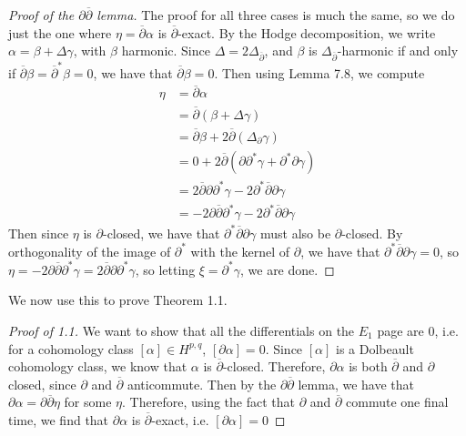 \documentclass[psamsfonts, 12pt]{amsart}
\theoremstyle{definition}
\theoremstyle{remark}
\newcommand{\dbar}{\overline{\partial}}
\begin{document}
%
\begin{proof}[Proof of the $\partial\dbar$ lemma]
The proof for all three cases is much the same, so we do just the one where
$\eta = \dbar\alpha$ is $\dbar$-exact. By the Hodge decomposition, we write
$\alpha = \beta + \Delta\gamma$, with $\beta$ harmonic. Since
$\Delta = 2\Delta_{\dbar}$, and $\beta$ is $\Delta_{\dbar}$-harmonic if and only
if $\dbar\beta = \dbar^*\beta = 0$, we have that $\dbar\beta = 0$. Then
using Lemma 7.8, we compute
\begin{align*}
\eta &= \dbar\alpha \\
&= \dbar(\beta + \Delta\gamma) \\
&= \dbar\beta + 2\dbar(\Delta_\partial\gamma) \\
&= 0 + 2\dbar(\partial\partial^*\gamma + \partial^*\partial\gamma) \\
&= 2\dbar\partial\partial^*\gamma - 2\partial^*\dbar\partial\gamma \\
&= -2\partial\dbar\partial^*\gamma - 2\partial^*\dbar\partial\gamma
\end{align*}
Then since $\eta$ is $\partial$-closed, we have that $\partial^*\dbar\partial\gamma$
must also be $\partial$-closed. By orthogonality of the image of $\partial^*$ with
the kernel of $\partial$, we have that $\partial^*\dbar\partial\gamma = 0$,
so $\eta = -2\partial\dbar\partial^*\gamma = 2\dbar\partial\partial^*\gamma$,
so letting $\xi = \partial^*\gamma$, we are done.
\end{proof}
%
We now use this to prove Theorem 1.1.
%
\begin{proof}[Proof of 1.1]
We want to show that all the differentials on the $E_1$ page are $0$, i.e.
for a cohomology class $[\alpha] \in H^{p,q}$, $[\partial\alpha] = 0$. Since
$[\alpha]$ is a Dolbeault cohomology class, we know that $\alpha$ is $\dbar$-closed.
Therefore, $\partial\alpha$ is both $\dbar$ and $\partial$ closed, since $\partial$
and $\dbar$ anticommute. Then by the $\partial\dbar$ lemma, we have that
$\partial\alpha = \partial\dbar\eta$ for some $\eta$. Therefore, using the
fact that $\partial$ and $\dbar$ commute one final time, we find that
$\partial\alpha$ is $\dbar$-exact, i.e. $[\partial\alpha] = 0$
\end{proof}
%
\end{document}
